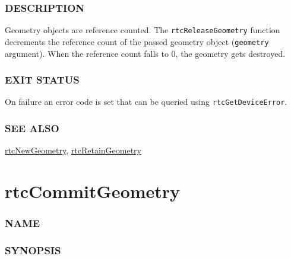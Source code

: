 \subsubsection{DESCRIPTION}\label{description}

Geometry objects are reference counted. The \texttt{rtcReleaseGeometry}
function decrements the reference count of the passed geometry object
(\texttt{geometry} argument). When the reference count falls to 0, the
geometry gets destroyed.

\subsubsection{EXIT STATUS}\label{exit-status}

On failure an error code is set that can be queried using
\texttt{rtcGetDeviceError}.

\subsubsection{SEE ALSO}\label{see-also}

\hyperref[rtcnewgeometry]{rtcNewGeometry},
\hyperref[rtcretaingeometry]{rtcRetainGeometry}

\pagebreak

\section{rtcCommitGeometry}\label{rtccommitgeometry}

\subsubsection{NAME}\label{name}

\begin{Shaded}
\begin{Highlighting}[]
\OperatorTok{{-}}
\end{Highlighting}
\end{Shaded}

\subsubsection{SYNOPSIS}\label{synopsis}

\begin{Shaded}
\begin{Highlighting}[]

\OperatorTok{(}\OperatorTok{);}
\end{Highlighting}
\end{Shaded}

